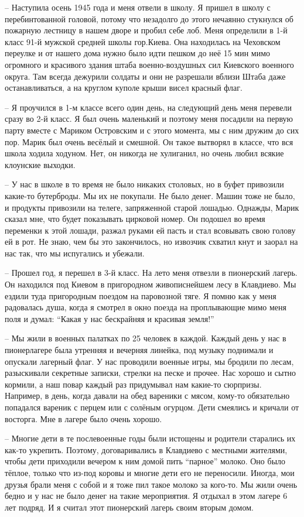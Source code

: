 – Наступила осень 1945 года и меня отвели в школу. Я пришел в школу с
перебинтованной головой, потому что незадолго до этого нечаянно стукнулся об
пожарную лестницу в нашем дворе и пробил себе лоб. Меня определили в 1-й класс
91-й мужской средней школы гор.Киева. Она находилась на Чеховском переулке и от
нашего дома нужно было идти пешком до неё 15 мин мимо огромного и красивого
здания штаба военно-воздушных сил Киевского военного округа. Там всегда
дежурили солдаты и они не разрешали вблизи Штаба даже останавливаться, а на
круглом куполе крыши висел красный флаг.

– Я проучился в 1-м классе всего один день,  на следующий день меня перевели
сразу во 2-й класс. Я был очень маленький и поэтому меня посадили на первую
парту вместе с Мариком Островским и с этого момента, мы с ним дружим до сих
пор.  Марик был очень весёлый и смешной. Он такое вытворял в классе, что вся
школа ходила ходуном. Нет, он никогда не хулиганил, но очень любил всякие
клоунские выходки.

– У нас в школе в то время не было никаких столовых,  но в буфет привозили
какие-то бутерброды. Мы их не покупали. Не было денег. Машин тоже не было, и
продукты привозили на телеге, запряженной старой лошадью. Однажды, Марик сказал
мне, что будет показывать цирковой номер. Он подошел во время переменки к этой
лошади, разжал руками ей пасть и стал всовывать свою голову ей в рот. Не знаю,
чем бы это закончилось, но извозчик схватил кнут и заорал на нас так, что мы
испугались и убежали.

– Прошел год, я перешел в 3-й класс. На лето меня отвезли в пионерский лагерь.
Он находился под Киевом в пригородном живописнейшем лесу в Клавдиево. Мы ездили
туда пригородным поездом на паровозной тяге. Я помню как у меня радовалась
душа, когда я смотрел в окно поезда на проплывающие мимо меня поля и думал:
“Какая у нас бескрайняя и красивая земля!”

– Мы жили в военных палатках по 25 человек в каждой. Каждый день у нас в
пионерлагере была утренняя и вечерняя линейка, под музыку поднимали и опускали
лагерный флаг. У нас проводили военные игры, мы бродили по лесам, разыскивали
секретные записки, стрелки на песке и прочее. Нас хорошо и сытно кормили, а наш
повар каждый раз придумывал нам какие-то сюрпризы. Например, в день, когда
давали на обед вареники с мясом, кому-то обязательно попадался вареник с перцем
или с солёным огурцом. Дети смеялись и кричали от восторга. Мне в лагере было
очень хорошо.

– Многие дети в те послевоенные годы были истощены и родители старались их
как-то укрепить. Поэтому, договаривались в Клавдиево с местными жителями, чтобы
дети приходили вечером к ним домой пить “парное” молоко. Оно было тёплое,
только что из-под коровы и многие дети его не переносили. Иногда, мои друзья
брали меня с собой и я тоже пил такое молоко за кого-то. Мы жили очень бедно и
у нас не было денег на такие мероприятия. Я отдыхал в этом лагере 6 лет подряд.
И я считал этот пионерский лагерь своим вторым домом.

